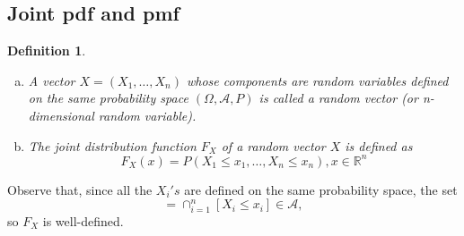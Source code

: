 \documentclass[12pt]{report} \addtolength{\textheight}{2in}
\newtheorem{defn}{Definition}
\newcommand{\Realnum}{\mathbb{R}}
\newcommand{\bigA}{\mathcal{A}}
\newcommand{\probsp}{(\Omega, \bigA, P)}
\begin{document}
\subsection*{Joint pdf and pmf}
\begin{defn}
\begin{enumerate}[(a)]
\item A vector $X=(X_1,\dots,X_n)$ whose components are random variables defined on the same probability space $\probsp$ is called a random vector (or n-dimensional random variable).
\item The joint distribution function $F_X$ of a random vector $X$ is defined as 
\begin{displaymath}
F_X(x)=P(X_1\leq x_1, \dots, X_n \leq x_n), x\in \Realnum^{n}
\end{displaymath}
\end{enumerate}
\end{defn}
Observe that, since all the $X_i's$ are defined on the same probability space, the set
\begin{displaymath}
[X_1\leq x_1, \dots, X_n \leq x_n] = \cap_{i=1}^{n} [X_i \leq x_i] \in \mathcal{A},
\end{displaymath}
so $F_X$ is well-defined.
\end{document}
